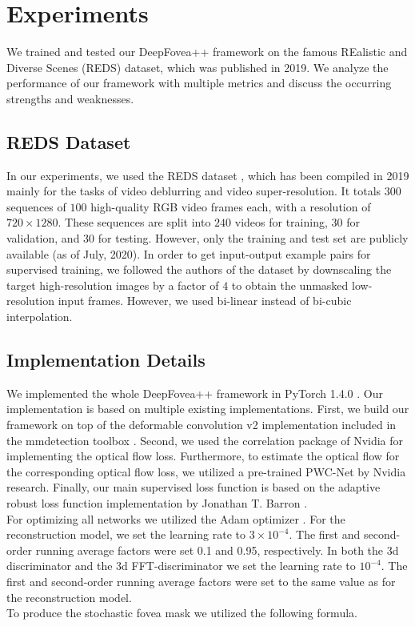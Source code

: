 \documentclass[10pt,twocolumn,letterpaper]{article}
\begin{document}
\section{Experiments} \label{sec:experiments}
We trained and tested our DeepFovea++ framework on the famous REalistic and Diverse Scenes (REDS) dataset, which was published in 2019. We analyze the performance of our framework with multiple metrics and discuss the occurring strengths and weaknesses.

\subsection{REDS Dataset} \label{subsec:redsdataset}
In our experiments, we used the REDS dataset \cite{REDS}, which has been compiled in 2019 mainly for the tasks of video deblurring and video super-resolution. It totals $300$ sequences of $100$ high-quality RGB video frames each, with a resolution of $720\times 1280$. These sequences are split into $240$ videos for training, $30$ for validation, and $30$ for testing. However, only the training and test set are publicly available (as of July, 2020). In order to get input-output example pairs for supervised training, we followed the authors of the dataset by downscaling the target high-resolution images by a factor of $4$ to obtain the unmasked low-resolution input frames. However, we used bi-linear instead of bi-cubic interpolation. \cite{REDS}


\subsection{Implementation Details} \label{subsec:implementationdetails}
We implemented the whole DeepFovea++ framework in PyTorch 1.4.0 \cite{pytorch}. Our implementation is based on multiple existing implementations. First, we build our framework on top of the deformable convolution v2 \cite{deformableconv} implementation included in the mmdetection toolbox \cite{mmdetection}. Second, we used the correlation package \cite{flownet2} of Nvidia for implementing the optical flow loss. Furthermore, to estimate the optical flow for the corresponding optical flow loss, we utilized a pre-trained PWC-Net \cite{pwcnet} by Nvidia research. Finally, our main supervised loss function is based on the adaptive robust loss function implementation by Jonathan T. Barron \cite{adaptiveroubustloss}.\\

For optimizing all networks we utilized the Adam optimizer \cite{adam}. For the reconstruction model, we set the learning rate to $3\times 10^{-4}$. The first and second-order running average factors were set 0.1 and 0.95, respectively. In both the 3d discriminator and the 3d FFT-discriminator we set the learning rate to $10^{-4}$. The first and second-order running average factors were set to the same value as for the reconstruction model.\\
To produce the stochastic fovea mask we utilized the following formula.
\end{document}
